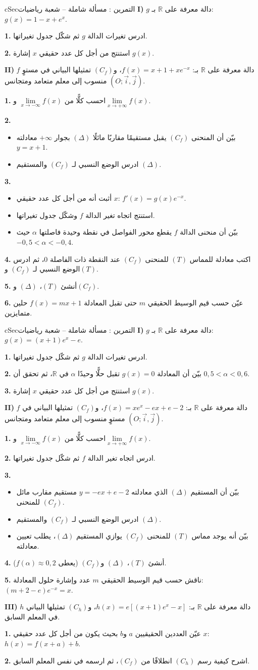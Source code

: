 \documentclass[12pt,a4paper]{article}
\newenvironment{BOX}[2]{\begin{otherlanguage}{english}\begin{arbox}{#1}{#2}}{\end{arbox}\end{otherlanguage}}
\newcounter{exo}
\newenvironment{tamrin}[1]{\stepcounter{exo}\begin{BOX}{cSec}{التمرين \theexo: #1}}{\end{BOX}}
\newcommand{\R}{\mathbb{R}}
\newenvironment{sq}{\begin{itemize}[leftmargin=2.4em,itemsep=3pt]}{\end{itemize}}
\newcommand{\qa}{\item[(أ)]}\newcommand{\qb}{\item[(ب)]}\newcommand{\qc}{\item[(جـ)]}\newcommand{\qd}{\item[(د)]}\newcommand{\qe}{\item[(هـ)]}
\newcommand{\QQ}[1]{\par\smallskip\textbf{#1.} }
\begin{document}
\begin{tamrin}{مسألة شاملة -- شعبة رياضيات}
\textbf{I)} $g$ دالة معرفة على $\R$ بـ: $g(x)=1-x+e^{x}$.
\QQ{1} ادرس تغيرات الدالة $g$ ثم شكّل جدول تغيراتها.
\QQ{2} استنتج من أجل كل عدد حقيقي $x$ إشارة $g(x)$.

\textbf{II)} $f$ دالة معرفة على $\R$ بـ: $f(x)=x+1+xe^{-x}$، و$(C_f)$ تمثيلها البياني في مستوٍ منسوب إلى معلم متعامد ومتجانس $(O;\vec i,\vec j)$.
\QQ{1} احسب كلًّا من $\lim\limits_{x\to-\infty}f(x)$ و$\lim\limits_{x\to+\infty}f(x)$.
\QQ{2}
\begin{sq}
\qa بيّن أن المنحنى $(C_f)$ يقبل مستقيمًا مقاربًا مائلًا $(\Delta)$ بجوار $+\infty$ معادلته $y=x+1$.
\qb ادرس الوضع النسبي لـ $(C_f)$ والمستقيم $(\Delta)$.
\end{sq}
\QQ{3}
\begin{sq}
\qa أثبت أنه من أجل كل عدد حقيقي $x$: $f'(x)=g(x)e^{-x}$.
\qb استنتج اتجاه تغير الدالة $f$ وشكّل جدول تغيراتها.
\qc بيّن أن منحنى الدالة $f$ يقطع محور الفواصل في نقطة وحيدة فاصلتها $\alpha$ حيث $-0{,}5<\alpha<-0{,}4$.
\end{sq}
\QQ{4} اكتب معادلة للمماس $(T)$ للمنحنى $(C_f)$ عند النقطة ذات الفاصلة $0$، ثم ادرس الوضع النسبي لـ $(C_f)$ و$(T)$.
\QQ{5} أنشئ $(T)$، $(\Delta)$ و$(C_f)$.
\QQ{6} عيّن حسب قيم الوسيط الحقيقي $m$ حتى تقبل المعادلة $f(x)=mx+1$ حلين متمايزين.
\end{tamrin}
\begin{tamrin}{مسألة شاملة -- شعبة رياضيات}
\textbf{I)} $g$ دالة معرفة على $\R$ بـ: $g(x)=(x+1)e^{x}-e$.
\QQ{1} ادرس تغيرات الدالة $g$ ثم شكّل جدول تغيراتها.
\QQ{2} بيّن أن المعادلة $g(x)=0$ تقبل حلًّا وحيدًا $\alpha$ في $\R$، ثم تحقق أن $0{,}5<\alpha<0{,}6$.
\QQ{3} استنتج من أجل كل عدد حقيقي $x$ إشارة $g(x)$.

\textbf{II)} $f$ دالة معرفة على $\R$ بـ: $f(x)=xe^{x}-ex+e-2$، و$(C_f)$ تمثيلها البياني في مستوٍ منسوب إلى معلم متعامد ومتجانس $(O;\vec i,\vec j)$.
\QQ{1} احسب كلًّا من $\lim\limits_{x\to-\infty}f(x)$ و$\lim\limits_{x\to+\infty}f(x)$.
\QQ{2} ادرس اتجاه تغير الدالة $f$ ثم شكّل جدول تغيراتها.
\QQ{3}
\begin{sq}
\qa بيّن أن المستقيم $(\Delta)$ الذي معادلته $y=-ex+e-2$ مستقيم مقارب مائل للمنحنى $(C_f)$.
\qb ادرس الوضع النسبي لـ $(C_f)$ والمستقيم $(\Delta)$.
\qc بيّن أنه يوجد مماس $(T)$ للمنحنى $(C_f)$ يوازي المستقيم $(\Delta)$، يطلب تعيين معادلته.
\end{sq}
\QQ{4} أنشئ $(T)$، $(\Delta)$ و$(C_f)$ (يعطى $f(\alpha)\approx0{,}2$).
\QQ{5} ناقش حسب قيم الوسيط الحقيقي $m$ عدد وإشارة حلول المعادلة: $(m+2-e)e^{-x}=x$.

\textbf{III)} $h$ دالة معرفة على $\R$ بـ: $h(x)=e\left[(x+1)e^{x}-x\right]$، و$(C_h)$ تمثيلها البياني في المعلم السابق.
\QQ{1} عيّن العددين الحقيقيين $a$ و$b$ بحيث يكون من أجل كل عدد حقيقي $x$: $h(x)=f(x+a)+b$.
\QQ{2} اشرح كيفية رسم $(C_h)$ انطلاقًا من $(C_f)$، ثم ارسمه في نفس المعلم السابق.
\end{tamrin}
\end{document}
